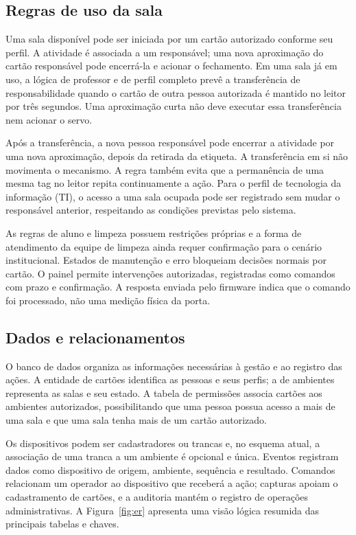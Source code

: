 \documentclass[12pt]{article}
\begin{document}
\subsection{Regras de uso da sala}

Uma sala disponível pode ser iniciada por um cartão autorizado conforme seu perfil. A atividade é associada a um responsável; uma nova aproximação do cartão responsável pode encerrá-la e acionar o fechamento. Em uma sala já em uso, a lógica de professor e de perfil completo prevê a transferência de responsabilidade quando o cartão de outra pessoa autorizada é mantido no leitor por três segundos. Uma aproximação curta não deve executar essa transferência nem acionar o servo.

Após a transferência, a nova pessoa responsável pode encerrar a atividade por uma nova aproximação, depois da retirada da etiqueta. A transferência em si não movimenta o mecanismo. A regra também evita que a permanência de uma mesma tag no leitor repita continuamente a ação. Para o perfil de tecnologia da informação (TI), o acesso a uma sala ocupada pode ser registrado sem mudar o responsável anterior, respeitando as condições previstas pelo sistema.

As regras de aluno e limpeza possuem restrições próprias e a forma de atendimento da equipe de limpeza ainda requer confirmação para o cenário institucional. Estados de manutenção e erro bloqueiam decisões normais por cartão. O painel permite intervenções autorizadas, registradas como comandos com prazo e confirmação. A resposta enviada pelo firmware indica que o comando foi processado, não uma medição física da porta.

\subsection{Dados e relacionamentos}

O banco de dados organiza as informações necessárias à gestão e ao registro das ações. A entidade de cartões identifica as pessoas e seus perfis; a de ambientes representa as salas e seu estado. A tabela de permissões associa cartões aos ambientes autorizados, possibilitando que uma pessoa possua acesso a mais de uma sala e que uma sala tenha mais de um cartão autorizado.

Os dispositivos podem ser cadastradores ou trancas e, no esquema atual, a associação de uma tranca a um ambiente é opcional e única. Eventos registram dados como dispositivo de origem, ambiente, sequência e resultado. Comandos relacionam um operador ao dispositivo que receberá a ação; capturas apoiam o cadastramento de cartões, e a auditoria mantém o registro de operações administrativas. A Figura~\ref{fig:er} apresenta uma visão lógica resumida das principais tabelas e chaves.
\end{document}
